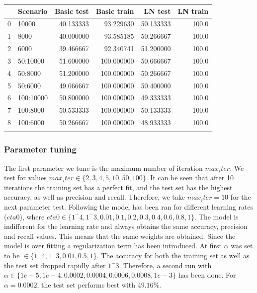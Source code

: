 \documentclass[11pt]{article}
\begin{document}
\begin{tabular}{llrrrr}
\toprule
{} &   Scenario &  Basic test &  Basic train &    LN test &  LN train \\
\midrule
0 &      10000 &   40.133333 &    93.229630 &  50.133333 &     100.0 \\
1 &       8000 &   40.000000 &    93.585185 &  50.266667 &     100.0 \\
2 &       6000 &   39.466667 &    92.340741 &  51.200000 &     100.0 \\
3 &   50:10000 &   51.600000 &   100.000000 &  50.666667 &     100.0 \\
4 &    50:8000 &   51.200000 &   100.000000 &  50.266667 &     100.0 \\
5 &    50:6000 &   49.066667 &   100.000000 &  50.400000 &     100.0 \\
6 &  100:10000 &   50.800000 &   100.000000 &  49.333333 &     100.0 \\
7 &   100:8000 &   50.533333 &   100.000000 &  50.133333 &     100.0 \\
8 &   100:6000 &   50.266667 &   100.000000 &  48.933333 &     100.0 \\
\bottomrule
\label{tab:Accuracy perceptron cross validation}
\end{tabular}

\subsubsection{Parameter tuning}
The first parameter we tune is the maximum number of iteration $max_iter$. We test for values $ max_iter \in \{2, 3, 4, 5, 10, 50, 100\}$. It can be seen that after 10 iterations the training set has a perfect fit, and the test set has the highest accuracy, as well as precision and recall. Therefore, we take $max_iter=10$ for the next parameter test.
\newline
Following the model has been ran for different learning rates ($eta0$), where $ eta0 \in \{1^-4, 1^-3, 0.01, 0.1, 0.2, 0.3, 0.4, 0.6, 0.8, 1\} $. The model is indifferent for the learning rate and always obtains the same accuracy, precision and recall values. This means that the same weights are obtained.
\newline
Since the model is over fitting a regularization term has been introduced. At first $\alpha$ was set to be $ \in \{1^-4, 1^-3, 0.01, 0.5, 1\}$. The accuracy for both the training set as well as the test set dropped rapidly after $1^-3$. Therefore, a second run with $\alpha \in  \{1e-5, 1e-4, 0.0002, 0.0004, 0.0006, 0.0008, 1e-3\}$ has been done. For $\alpha=0.0002$, the test set performs best with $49.16\%$. 
\end{document}

